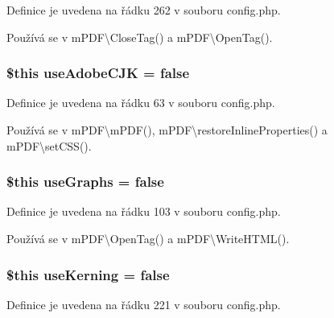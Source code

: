 Definice je uvedena na řádku 262 v souboru config.\-php.



Používá se v m\-P\-D\-F\textbackslash{}\-Close\-Tag() a m\-P\-D\-F\textbackslash{}\-Open\-Tag().

\hypertarget{config_8php_ad0b49b3b058f257114a2cd364408978a}{
\subsubsection[{use\-Adobe\-C\-J\-K}]{\setlength{\rightskip}{0pt plus 5cm}\$this use\-Adobe\-C\-J\-K = {\bf false}}}\label{config_8php_ad0b49b3b058f257114a2cd364408978a}


Definice je uvedena na řádku 63 v souboru config.\-php.



Používá se v m\-P\-D\-F\textbackslash{}m\-P\-D\-F(), m\-P\-D\-F\textbackslash{}restore\-Inline\-Properties() a m\-P\-D\-F\textbackslash{}set\-C\-S\-S().

\hypertarget{config_8php_a881f1e9a5472904db96657e5c78b570e}{
\subsubsection[{use\-Graphs}]{\setlength{\rightskip}{0pt plus 5cm}\$this use\-Graphs = {\bf false}}}\label{config_8php_a881f1e9a5472904db96657e5c78b570e}


Definice je uvedena na řádku 103 v souboru config.\-php.



Používá se v m\-P\-D\-F\textbackslash{}\-Open\-Tag() a m\-P\-D\-F\textbackslash{}\-Write\-H\-T\-M\-L().

\hypertarget{config_8php_a6de601bb5dd0f7aa61d8e97149276fee}{
\subsubsection[{use\-Kerning}]{\setlength{\rightskip}{0pt plus 5cm}\$this use\-Kerning = {\bf false}}}\label{config_8php_a6de601bb5dd0f7aa61d8e97149276fee}


Definice je uvedena na řádku 221 v souboru config.\-php.



